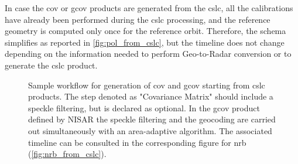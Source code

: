 In case the \acs{cov} or \acs{gcov} products are generated from the \acs{cslc}, all the calibrations have already been performed during the \acs{cslc} processing, and the reference geometry is computed only once for the reference orbit. Therefore, the schema simplifies as reported in \autoref{fig:pol_from_cslc}, but the timeline does not change depending on the information needed to perform Geo-to-Radar conversion or to generate the \acs{cslc} product.
\begin{figure}[H]
	\centering
	\caption{Sample workflow for generation of \acs{cov} and \acs{gcov} starting from \acs{cslc} products. The step denoted as "Covariance Matrix" should include a speckle filtering, but is declared as optional. In the \acs{gcov} product defined by NISAR the speckle filtering and the geocoding are carried out simultaneously with an area-adaptive algorithm. The associated timeline can be consulted in the corresponding figure for \acs{nrb} (\autoref{fig:nrb_from_cslc}).}
	\label{fig:pol_from_cslc}
\end{figure}

